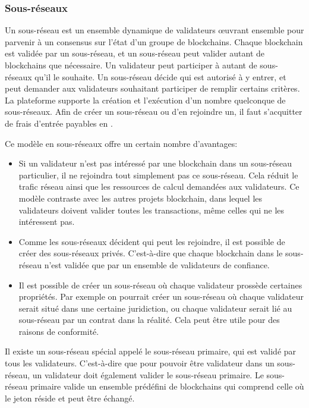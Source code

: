 \documentclass[runningheads,francais,a4paper]{llncs}
\begin{document}
\subsubsection{Sous-réseaux}
Un sous-réseau est un ensemble dynamique de validateurs œuvrant ensemble pour parvenir à un consensus sur l'état d'un
groupe de blockchains. Chaque blockchain est validée par un sous-réseau, et un sous-réseau peut valider autant de
blockchains que nécessaire. Un validateur peut participer à autant de sous-réseaux qu'il le souhaite. Un sous-réseau
décide qui est autorisé à y entrer, et peut demander aux validateurs souhaitant participer de remplir certains
critères. La plateforme \AVAPlatformName{} supporte la création et l'exécution d'un nombre quelconque de sous-réseaux.
Afin de créer un sous-réseau ou d'en rejoindre un, il faut s'acquitter de frais d'entrée payables en \AVATokenName{}.

Ce modèle en sous-réseaux offre un certain nombre d'avantages:
\begin{itemize}
\item Si un validateur n'est pas intéressé par une blockchain dans un sous-réseau particulier, il ne rejoindra tout
simplement pas ce sous-réseau. Cela réduit le trafic réseau ainsi que les ressources de calcul demandées aux validateurs.
Ce modèle contraste avec les autres projets blockchain, dans lequel les validateurs doivent valider toutes les
transactions, même celles qui ne les intéressent pas.
\item Comme les sous-réseaux décident qui peut les rejoindre, il est possible de créer des sous-réseaux privés.
C'est-à-dire que chaque blockchain dans le sous-réseau n'est validée que par un ensemble de validateurs de confiance.
\item Il est possible de créer un sous-réseau où chaque validateur prossède certaines propriétés. Par exemple on pourrait
créer un sous-réseau où chaque validateur serait situé dans une certaine juridiction, ou chaque validateur serait lié au
sous-réseau par un contrat dans la réalité. Cela peut être utile pour des raisons de conformité.
\end{itemize}

Il existe un sous-réseau spécial appelé le sous-réseau primaire, qui est validé par tous les validateurs.
C'est-à-dire que pour pouvoir être validateur dans un sous-réseau, un validateur doit également valider le sous-réseau
primaire. Le sous-réseau primaire valide un ensemble prédéfini de blockchains qui comprend celle où le jeton
\AVATokenName{} réside et peut être échangé.
\end{document}
